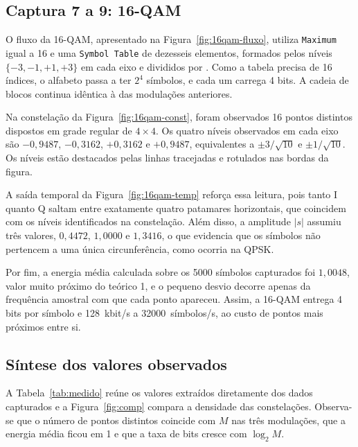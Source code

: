 \subsection{Captura 7 a 9: 16-QAM}

O fluxo da 16-QAM, apresentado na Figura~\ref{fig:16qam-fluxo}, utiliza \texttt{Maximum} igual a 16 e uma \texttt{Symbol Table} de dezesseis elementos, formados pelos níveis $\{-3,-1,+1,+3\}$ em cada eixo e divididos por . Como a tabela precisa de 16 índices, o alfabeto passa a ter $2^4$ símbolos, e cada um carrega 4 bits. A cadeia de blocos continua idêntica à das modulações anteriores.


Na constelação da Figura~\ref{fig:16qam-const}, foram observados 16 pontos distintos dispostos em grade regular de $4\times4$. Os quatro níveis observados em cada eixo são $-0{,}9487$, $-0{,}3162$, $+0{,}3162$ e $+0{,}9487$, equivalentes a $\pm3/\sqrt{10}$ e $\pm1/\sqrt{10}$. Os níveis estão destacados pelas linhas tracejadas e rotulados nas bordas da figura.


A saída temporal da Figura~\ref{fig:16qam-temp} reforça essa leitura, pois tanto I quanto Q saltam entre exatamente quatro patamares horizontais, que coincidem com os níveis identificados na constelação. Além disso, a amplitude $|s|$ assumiu três valores, $0{,}4472$, $1{,}0000$ e $1{,}3416$, o que evidencia que os símbolos não pertencem a uma única circunferência, como ocorria na QPSK.


Por fim, a energia média calculada sobre os 5000 símbolos capturados foi $1{,}0048$, valor muito próximo do teórico 1, e o pequeno desvio decorre apenas da frequência amostral com que cada ponto apareceu. Assim, a 16-QAM entrega 4 bits por símbolo e \SI{128}{kbit/s} a \num{32000}~símbolos/s, ao custo de pontos mais próximos entre si.

\subsection{Síntese dos valores observados}

A Tabela~\ref{tab:medido} reúne os valores extraídos diretamente dos dados capturados e a Figura~\ref{fig:comp} compara a densidade das constelações. Observa-se que o número de pontos distintos coincide com $M$ nas três modulações, que a energia média ficou em 1 e que a taxa de bits cresce com $\log_2 M$.

